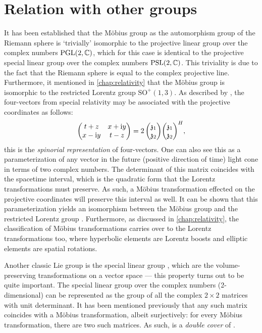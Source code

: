 \section{Relation with other groups}
\label{sec:other_groups}
It has been established that the Möbius group as the automorphism group of the Riemann sphere is `trivially' isomorphic to the projective linear group over the complex numbers $\mathrm{PGL}(2, \mathbb{C})$, which for this case is identical to the projective special linear group over the complex numbers $\mathrm{PSL}(2, \mathbb{C})$. This triviality is due to the fact that the Riemann sphere is equal to the complex projective line. Furthermore, it mentioned in \cref{chap:relativity} that the Möbius group is isomorphic to the restricted Lorentz group $\text{SO}^+(1,3)$. As described by \citet{Needham2021}, the four-vectors from special relativity may be associated with the projective coordinates as follows:
$$
    \mqty(t + z & x + \ii y\\ x - \ii y & t - z) = 2\,\mqty(\mathfrak{z}_1 \\ \mathfrak{z}_2)\mqty(\mathfrak{z}_1 \\ \mathfrak{z}_2)^H,
$$
this is the \emph{spinorial representation} of four-vectors. One can also see this as a parameterization of any vector in the future (positive direction of time) light cone in terms of two complex numbers. The determinant of this matrix coincides with the spacetime interval, which is the quadratic form that the Lorentz transformations must preserve. As such, a Möbius transformation effected on the projective coordinates will preserve this interval as well. It can be shown that this parameterization yields an isomorphism between the Möbius group and the restricted Lorentz group \cite{Penrose1984}. Furthermore, as discussed in \cref{chap:relativity}, the classification of Möbius transformations carries over to the Lorentz transformations too, where hyperbolic elements are Lorentz boosts and elliptic elements are spatial rotations.

Another classic Lie group is the special linear group , which are the volume-preserving transformations on a vector space --- this property turns out to be quite important. The special linear group over the complex numbers (2-dimensional)  can be represented as the group of all the complex \(2\times2\) matrices with unit determinant. It has been mentioned previously that any such matrix coincides with a Möbius transformation, albeit surjectively: for every Möbius transformation, there are two such matrices. As such,  is a \emph{double cover} of \moebiusgroup.

